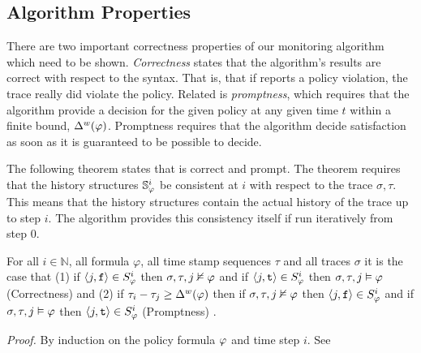 \subsection{Algorithm Properties}
There are two important correctness properties of our monitoring algorithm which need to be shown. \emph{Correctness} states that the algorithm's results are correct with respect to the syntax. That is, that if \monitor reports a policy violation, the trace really did violate the policy. Related is \emph{promptness}, which requires that the algorithm provide a decision for the given policy at any given time $t$ within a finite bound, $\Delta^w(\varphi)$. Promptness requires that the algorithm decide satisfaction as soon as it is guaranteed to be possible to decide. 
%

The following theorem states that \monitor is correct and prompt. The theorem requires that the history structures $\mathbb{S}^{i}_{\varphi}$ be consistent at $i$ with respect to the trace $\sigma,\tau$. This means that the history structures contain the actual history of the trace up to step $i$. The algorithm provides this consistency itself if run iteratively from step $0$.

\begin{theorem}
For all $i \in \mathbb{N}$, all formula $\varphi$, all time stamp sequences $\tau$ and all traces $\sigma$ it is the case that (1) if $\langle j, \mathrm{\texttt{f}} \rangle \in {S}^{i}_{\varphi}$ then $\sigma, \tau, j \nvDash \varphi$ and if $\langle j, \mathrm{\texttt{t}} \rangle \in {S}^{i}_{\varphi}$ then $\sigma, \tau, j \vDash \varphi$ (Correctness) and (2) if $\tau_i - \tau_j \geq \Delta^w(\varphi)$ then if $\sigma, \tau, j \nvDash \varphi$ then $\langle j, \mathrm{\texttt{f}} \rangle \in {S}^{i}_{\varphi}$ and if $\sigma, \tau, j \vDash \varphi$ then $\langle j, \mathrm{\texttt{t}} \rangle \in {S}^{i}_{\varphi}$ (Promptness)
.
\end{theorem}
\textit{Proof.} By  induction on the policy formula $\varphi$ and time step $i$. See \cite{Kane2015} \\

%

